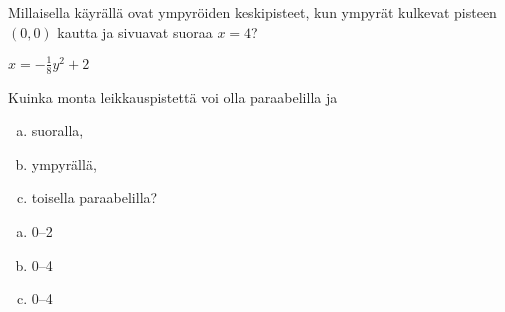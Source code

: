 \begin{tehtavasivu}
\begin{tehtava}
Millaisella käyrällä ovat ympyröiden keskipisteet, kun ympyrät kulkevat pisteen $(0, 0)$ kautta ja sivuavat suoraa $x=4$?
\begin{vastaus}
$x=-\frac{1}{8}y^2+2$
\end{vastaus}
\end{tehtava}

\begin{tehtava}
Kuinka monta leikkauspistettä voi olla paraabelilla ja
\begin{enumerate}[a)]
\item suoralla,
\item ympyrällä,
\item toisella paraabelilla?
\end{enumerate}
\begin{vastaus}
\begin{enumerate}[a)]
\item 0--2
\item 0--4
\item 0--4
\end{enumerate}
\end{vastaus}
\end{tehtava}


\end{tehtavasivu}